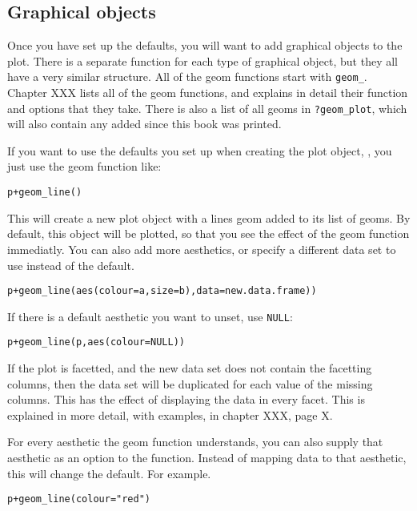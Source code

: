 \subsection{Graphical objects}\label{sub:graphical_objects}

Once you have set up the defaults, you will want to add graphical objects to the plot.  There is a separate function for each type of graphical object, but they all have a very similar structure.  All of the geom functions start with {\tt geom_}.  Chapter XXX lists all of the geom functions, and explains in detail their function and options that they take.  There is also a list of all geoms in {\tt ?geom_plot}, which will also contain any added since this book was printed.

If you want to use the defaults you set up when creating the plot object, , you just use the geom function like:

\begin{alltt}
p + geom_line()
\end{alltt}

This will create a new plot object with a lines geom added to its list of geoms.  By default, this object will be plotted, so that you see the effect of the geom function immediatly.  You can also add more aesthetics, or specify a different data set to use instead of the default.  

\begin{alltt}
p + geom_line(aes(colour=a, size=b), data=new.data.frame))
\end{alltt}

If there is a default aesthetic you want to unset, use {\tt NULL}:

\begin{alltt}
p + geom_line(p, aes(colour=NULL))
\end{alltt}

If the plot is facetted, and the new data set does not contain the facetting columns, then the data set will be duplicated for each value of the missing columns.  This has the effect of displaying the data in every facet.  This is explained in more detail, with examples, in chapter XXX, page X.

For every aesthetic the geom function understands, you can also supply that aesthetic as an option to the function.  Instead of mapping data to that aesthetic, this will change the default.  For example.

\begin{alltt}
p + geom_line(colour="red")  
\end{alltt}

